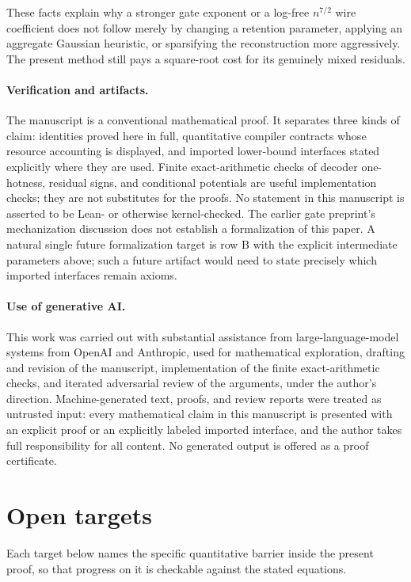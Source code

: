 \documentclass[11pt,letterpaper]{article}
\theoremstyle{definition}
\theoremstyle{remark}
\begin{document}
These facts explain why a stronger gate exponent or a log-free
$n^{7/2}$ wire coefficient does not follow merely by changing a
retention parameter, applying an aggregate Gaussian heuristic, or
sparsifying the reconstruction more aggressively. The present method
still pays a square-root cost for its genuinely mixed residuals.

\paragraph{Verification and artifacts.}
The manuscript is a conventional mathematical proof. It separates
three kinds of claim: identities proved here in full, quantitative
compiler contracts whose resource accounting is displayed, and
imported lower-bound interfaces stated explicitly where they are
used. Finite exact-arithmetic checks of
decoder one-hotness, residual signs, and conditional potentials are
useful implementation checks; they are not substitutes for the proofs.
No statement in this manuscript is asserted to be Lean- or otherwise
kernel-checked. The earlier gate preprint's mechanization discussion
does not establish a formalization of this paper. A natural single
future formalization target is row B with the explicit intermediate
parameters above; such a future artifact would need to state precisely
which imported interfaces remain axioms.

\paragraph{Use of generative AI.}
This work was carried out with substantial assistance from
large-language-model systems from OpenAI and Anthropic, used for
mathematical exploration, drafting and revision of the manuscript,
implementation of the finite exact-arithmetic checks, and iterated
adversarial review of the arguments, under the author's direction.
Machine-generated text, proofs, and review reports were treated as
untrusted input: every mathematical claim in this manuscript is
presented with an explicit proof or an explicitly labeled imported
interface, and the author takes full responsibility for all content.
No generated output is offered as a proof certificate.

\section{Open targets}
\label{sec:open}

Each target below names the specific quantitative barrier inside the
present proof, so that progress on it is checkable against the stated
equations.
\end{document}
